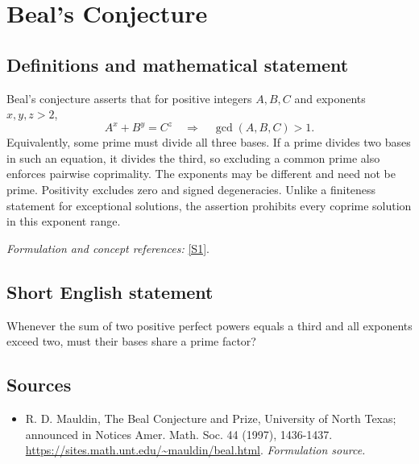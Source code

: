 \documentclass[11pt]{article}
\begin{document}
\section*{\texorpdfstring{Beal's Conjecture}{Beal's Conjecture}}\label{1286}
\subsection{Definitions and mathematical statement}
Beal's conjecture asserts that for positive integers $A,B,C$ and exponents $x,y,z>2$,
\[
 A^x+B^y=C^z\quad\Longrightarrow\quad\gcd(A,B,C)>1.
\]
Equivalently, some prime must divide all three bases. If a prime divides two bases in such an equation, it divides the third, so excluding a common prime also enforces pairwise coprimality. The exponents may be different and need not be prime. Positivity excludes zero and signed degeneracies. Unlike a finiteness statement for exceptional solutions, the assertion prohibits every coprime solution in this exponent range.
\par\smallskip\textit{Formulation and concept references:} \href{https://sites.math.unt.edu/~mauldin/beal.html}{[S1]}.

\subsection{Short English statement}
Whenever the sum of two positive perfect powers equals a third and all exponents exceed two, must their bases share a prime factor?
\subsection{Sources}
\begin{itemize}
\item[S1]R. D. Mauldin, The Beal Conjecture and Prize, University of North Texas; announced in Notices Amer. Math. Soc. 44 (1997), 1436-1437.
\url{https://sites.math.unt.edu/~mauldin/beal.html}.
\textit{Formulation source.}
\end{itemize}
\end{document}
